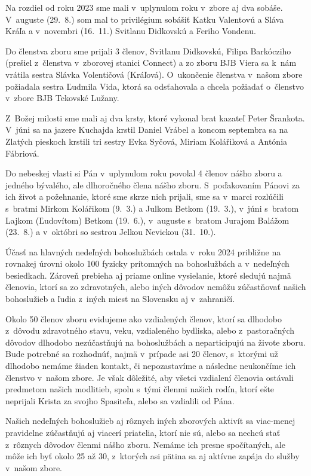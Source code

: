 Na rozdiel od roku 2023 sme mali v~uplynulom roku v~zbore aj dva sobáše. V~auguste (29.~8.) som mal to privilégium sobášiť Katku Valentovú a Sláva Kráľa a v~novembri (16.~11.) Svitlanu Didkovskú a Feriho Vondenu.

Do členstva zboru sme prijali 3 členov, Svitlanu Didkovskú, Filipa Barkócziho (prešiel z~členstva v~zborovej stanici Connect) a zo zboru BJB Viera sa k~nám vrátila sestra Slávka Volentičová (Kráľová). O~ukončenie členstva v~našom zbore požiadala sestra Ľudmila Vida, ktorá sa odsťahovala a chcela požiadať o~členstvo v~zbore BJB Tekovské Lužany.

Z~Božej milosti sme mali aj dva krsty, ktoré vykonal brat kazateľ Peter Šrankota. V~júni sa na jazere Kuchajda krstil Daniel Vrábel a koncom septembra sa na Zlatých pieskoch krstili tri sestry Evka Syčová, Miriam Kolářiková a Antónia Fábriová.

Do nebeskej vlasti si Pán v~uplynulom roku povolal 4 členov nášho zboru a jedného bývalého, ale dlhoročného člena nášho zboru. S~poďakovaním Pánovi za ich život a požehnanie, ktoré sme skrze nich prijali, sme sa v~marci rozlúčili s~bratmi Mirkom Kolářikom (9.~3.) a Julkom Betkom (19.~3.), v~júni s~bratom Lajkom (Ľudovítom) Betkom (19.~6.), v~auguste s~bratom Jurajom Balážom (23.~8.) a v~októbri so sestrou Jelkou Nevickou (31.~10.).

Účasť na hlavných nedeľných bohoslužbách ostala v~roku 2024 približne na rovnakej úrovni okolo 100 fyzicky prítomných na bohoslužbách a v~nedeľných besiedkach. Zároveň prebieha aj priame online vysielanie, ktoré sledujú najmä členovia, ktorí sa zo zdravotných, alebo iných dôvodov nemôžu zúčastňovať našich bohoslužieb a ľudia z~iných miest na Slovensku aj v~zahraničí.

Okolo 50 členov zboru evidujeme ako vzdialených členov, ktorí sa dlhodobo z~dôvodu zdravotného stavu, veku, vzdialeného bydliska, alebo z~pastoračných dôvodov dlhodobo nezúčastňujú na bohoslužbách a neparticipujú na živote zboru. Bude potrebné sa rozhodnúť, najmä v~prípade asi 20 členov, s~ktorými už dlhodobo nemáme žiaden kontakt, či nepozastavíme a následne neukončíme ich členstvo v~našom zbore. Je však dôležité, aby všetci vzdialení členovia ostávali predmetom našich modlitieb, spolu s~tými členmi našich rodín, ktorí ešte neprijali Krista za svojho Spasiteľa, alebo sa vzdialili od Pána.

Našich nedeľných bohoslužieb aj rôznych iných zborových aktivít sa viac-menej pravidelne zúčastňujú aj viacerí priatelia, ktorí nie sú, alebo sa nechcú stať z~rôznych dôvodov členmi nášho zboru. Nemáme ich presne spočítaných, ale môže ich byť okolo 25 až 30, z~ktorých asi pätina sa aj aktívne zapája do služby v~našom zbore.

